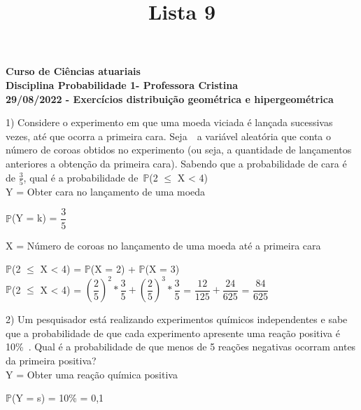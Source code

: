 \documentclass[12pt,a4paper,draft]{article}
\title{Lista 9}
\date{}
\begin{document}
	\maketitle
	\begin{center}
		\textbf{Curso de Ciências atuariais}\\
		\textbf{Disciplina Probabilidade 1- Professora Cristina}\\
		\textbf{29/08/2022 - Exercícios distribuição geométrica e hipergeométrica}
	\end{center}
	1) Considere o experimento em que uma moeda viciada é lançada sucessivas vezes, até que ocorra a primeira cara. Seja  a variável aleatória que conta o número de coroas obtidos no experimento (ou seja, a quantidade de lançamentos anteriores a obtenção da primeira cara). Sabendo que a probabilidade de cara é de $\frac{3}{5}$, qual é a probabilidade de $\mathbb{P}$(2 $\leq$ X < 4)
	\vspace{0.5cm}\\
	Y = Obter cara no lançamento de uma moeda
	\begin{center}
		\vspace{0.5cm}
		$\mathbb{P}$(Y = k) = $\dfrac{3}{5}$
	\end{center}
	\vspace{1cm}
	X = Número de coroas no lançamento de uma moeda até a primeira cara
	\begin{center}
		\vspace{0.5cm}
		$\mathbb{P}$(2 $\leq$ X < 4) = $\mathbb{P}$(X = 2) + $\mathbb{P}$(X = 3)
		\vspace{0.5cm}\\
		$\mathbb{P}$(2 $\leq$ X < 4) = $\left(\dfrac{2}{5}\right)^2 * \dfrac{3}{5} + \left(\dfrac{2}{5}\right)^3 * \dfrac{3}{5}$ = $\dfrac{12}{125} + \dfrac{24}{625}$ = $\dfrac{84}{625}$
	\end{center}
	\vspace{1cm}
	2) Um pesquisador está realizando experimentos químicos independentes e sabe que a probabilidade de que cada experimento apresente uma reação positiva é 10\% . Qual é a probabilidade de que menos de 5 reações negativas ocorram antes da primeira positiva?
	\vspace{0.5cm}\\
	Y = Obter uma reação química positiva
	\begin{center}
		\vspace{0.5cm}
		$\mathbb{P}$(Y = s) = 10\% = 0,1
	\end{center}
	\vspace{1cm}
\end{document}
